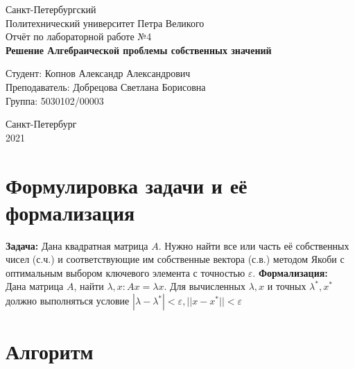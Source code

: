 \documentclass[11pt,a4paper]{article}
\let\epsilon\varepsilon
\renewcommand\;{\hspace{1cm}}
\begin{document}
\begin{titlepage}
  \Large
  \begin{center}
    Санкт-Петербургский\\
    Политехнический университет Петра Великого\\
    \vspace{10em}
    Отчёт по лабораторной работе №4\\
    \vspace{2em}
    \textbf{Решение Алгебраической проблемы собственных значений}
  \end{center}
  \vspace{6em}
  \begin{flushright}
    Студент: Копнов Александр Александрович\\
    Преподаватель: Добрецова Светлана Борисовна\\
    Группа: 5030102/00003
  \end{flushright}
  \vspace{\fill}
  \begin{center}
    Санкт-Петербург\\
    2021
  \end{center}
\end{titlepage}
\tableofcontents
\pagebreak

\section{Формулировка задачи и её формализация}
\textbf{Задача:} Дана квадратная матрица $A$. Нужно найти все или часть её собственных чисел (с.ч.) и соответствующие им собственные вектора (с.в.) методом Якоби с оптимальным выбором ключевого элемента с точностью $\epsilon$.
\textbf{Формализация:}\\
Дана матрица $A$, найти $\lambda, x : Ax = \lambda x$.
Для вычисленных $\lambda, x$ и точных $\lambda^{*},x^{*}$ должно выполняться условие $|\lambda - \lambda^{*}| < \epsilon, ||x - x^{*}|| < \epsilon$
\section{Алгоритм}
\end{document}
